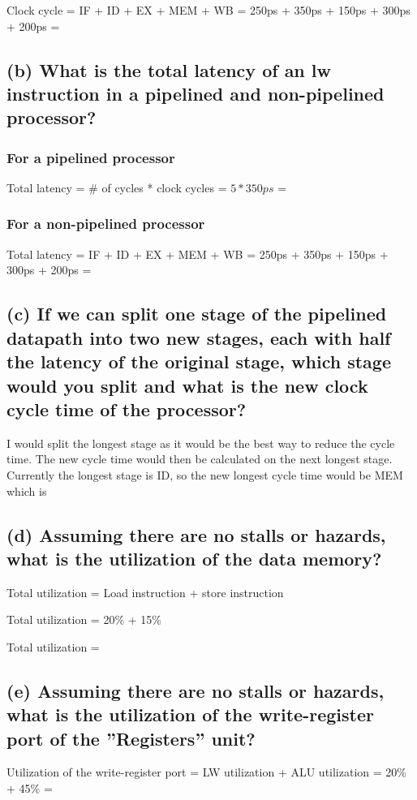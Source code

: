 \documentclass{article}
\begin{document}
    Clock cycle = IF + ID + EX + MEM + WB = 250ps + 350ps + 150ps + 300ps + 200ps = 

    \subsection*{(b) What is the total latency of an lw instruction in a
    pipelined and non-pipelined processor?}

    \subsubsection*{For a pipelined processor}

    Total latency = \# of cycles * clock cycles = $5 * 350ps$ = 

    \subsubsection*{For a non-pipelined processor}

    Total latency = IF + ID + EX + MEM + WB =  250ps + 350ps + 150ps + 300ps + 200ps =  

    \subsection*{(c)  If we can split one stage of the pipelined datapath
    into two new stages, each with half the latency of the
    original stage, which stage would you split and what
    is the new clock cycle time of the processor?}

    \noindent I would split the longest stage as it would be the best way to reduce the cycle
time. The new cycle time would then be calculated on the next longest stage.
Currently the longest stage is ID, so the new longest cycle time would be MEM
which is 

    \subsection*{(d)  Assuming there are no stalls or hazards, what is the
    utilization of the data memory?}

    Total utilization = Load instruction + store instruction

    Total utilization = 20\% + 15\%

    Total utilization = 

    \subsection*{(e) Assuming there are no stalls or hazards, what is the
    utilization of the write-register port of the ”Registers”
    unit?}

    Utilization of the write-register port = LW utilization + ALU utilization = 20\% + 45\% = 
\end{document}
